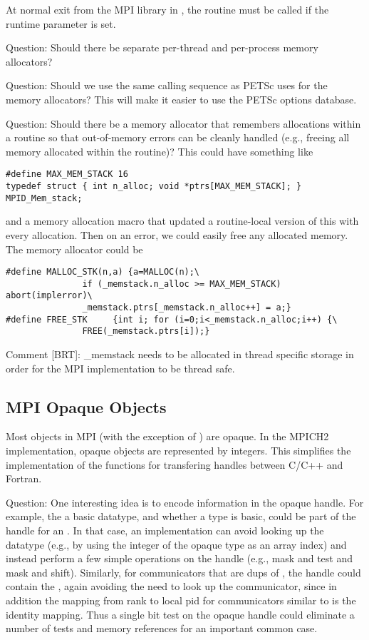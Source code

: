 \documentclass{article}
\begin{document}
At normal exit from the MPI library in , the
routine  must be called if the runtime parameter
 is set.  

Question: Should there be separate per-thread and per-process memory
allocators? 

Question: Should we use the same calling sequence as PETSc uses for the memory
allocators?  This will make it easier to use the PETSc options database.

Question: Should there be a memory allocator that remembers allocations within
a routine so that out-of-memory errors can be cleanly handled (e.g., freeing
all memory allocated within the routine)?  This could have something like
\begin{verbatim}
#define MAX_MEM_STACK 16
typedef struct { int n_alloc; void *ptrs[MAX_MEM_STACK]; } MPID_Mem_stack;
\end{verbatim}
and a memory allocation macro that updated a routine-local version of this
with every allocation.  Then on an error, we could easily free any allocated
memory.  The memory allocator could be
\begin{verbatim}
#define MALLOC_STK(n,a) {a=MALLOC(n);\
               if (_memstack.n_alloc >= MAX_MEM_STACK) abort(implerror)\
               _memstack.ptrs[_memstack.n_alloc++] = a;}
#define FREE_STK     {int i; for (i=0;i<_memstack.n_alloc;i++) {\
               FREE(_memstack.ptrs[i]);}
\end{verbatim}

Comment [BRT]: _memstack needs to be allocated in thread specific
storage in order for the MPI implementation to be thread safe.

\subsection{MPI Opaque Objects}

Most objects in MPI (with the exception of ) are
opaque.  In the MPICH2 implementation, opaque objects are represented
by integers.  This simplifies the implementation of the functions for
transfering handles between C/C++ and Fortran.  

Question:  One interesting idea is to encode information in the opaque
handle.  For example, the \code{sizeof} a basic datatype, and whether
a type is basic, could be part of the handle for an
\code{MPI_Datatype}. In that case, an implementation can avoid looking
up the datatype (e.g., by using the integer of the opaque type as an
array index) and instead perform a few simple operations on the handle
(e.g., mask and test and mask and shift).  Similarly, for
communicators that are dups of , the handle could
contain the \code{context_id}, again avoiding the need to look up the
communicator, since in addition the mapping from rank to local pid for 
communicators similar to \code{MPI_COMM_WORLD} is the identity
mapping.  Thus a single bit test on the opaque handle could eliminate
a number of tests and memory references for an important common case.
\end{document}
